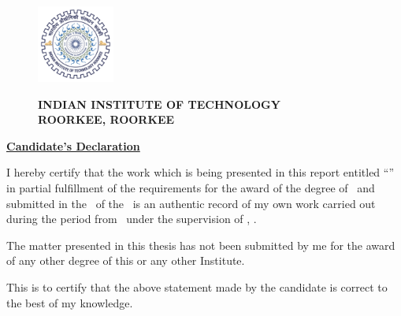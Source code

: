 \thispagestyle{empty}
\begin{figure}[htb]
	\begin{minipage}{0.12\textwidth}
	\includegraphics[width=1in, height=1in]{01.Cover/logo.pdf}
	\end{minipage}%
	\begin{minipage}[t]{0.88\textwidth}
	\begin{center}
		{
			\large
	 		\bfseries
	 		INDIAN INSTITUTE OF TECHNOLOGY\\
	 		ROORKEE, ROORKEE
		}
	\end{center}
	\end{minipage}
\end{figure}

\begin{center}
	\textbf{\underline{{Candidate's Declaration}}}
\end{center}


\vspace{0.5cm}
I hereby certify that the work which is being presented in this report entitled “\ttitle” in partial fulfillment of the requirements for the award of the degree of \degreename\ and submitted in the \deptname\ of the \univname\ is an authentic record of my own work carried out during the period from \workduration\ under the supervision of \supname, \suptitle{}.

\vspace{.05cm}

The matter presented in this thesis has not been submitted by
me for the award of any other degree of this or any other
Institute.
\vspace{1.5cm}

\begin{flushright}
	\bfseries  \authorname
\end{flushright}

This is to certify that the above statement made by the
candidate is correct to the best of my knowledge. \vspace{.3cm}
\vspace{2cm}

